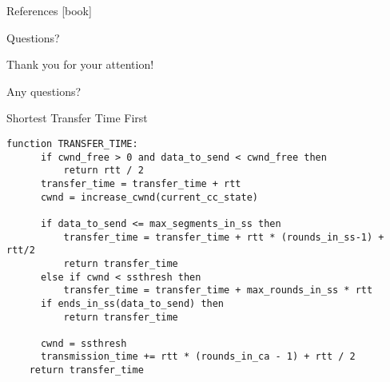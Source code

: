 \documentclass{beamer}
\begin{document}
\appendix


\begin{frame}[allowframebreaks]{References}
  \small
  [book]
  {}
  
\end{frame}

\begin{frame}{Questions?}
  \begin{center}
    Thank you for your attention!

    Any questions?
  \end{center}
\end{frame}


\begin{frame}[fragile]{Shortest Transfer Time First}
  \begin{lstlisting}[frame=single, basicstyle=\tiny, caption={STTF pseudo code,  \textcolor{uos-grey-full}{Source: \cite{lowlatschedulers}}}, label=code::sttf]
  function TRANSFER_TIME:
      if cwnd_free > 0 and data_to_send < cwnd_free then
          return rtt / 2
      transfer_time = transfer_time + rtt
      cwnd = increase_cwnd(current_cc_state)

      if data_to_send <= max_segments_in_ss then
          transfer_time = transfer_time + rtt * (rounds_in_ss-1) + rtt/2
          return transfer_time
      else if cwnd < ssthresh then
          transfer_time = transfer_time + max_rounds_in_ss * rtt
      if ends_in_ss(data_to_send) then
          return transfer_time

      cwnd = ssthresh
      transmission_time += rtt * (rounds_in_ca - 1) + rtt / 2
    return transfer_time
  \end{lstlisting}
\end{frame}
\end{document}
